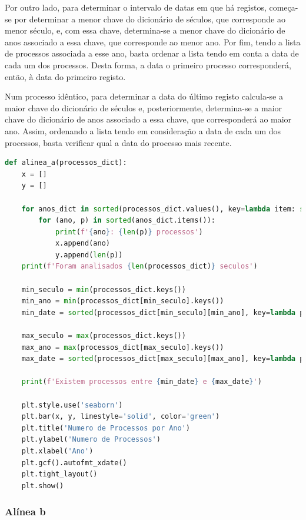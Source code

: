 \documentclass[a4paper, 11pt]{article}
\begin{document}
Por outro lado, para determinar o intervalo de datas em que há registos, começa-se por determinar a
menor chave do dicionário de séculos, que corresponde ao menor século, e, com essa chave, determina-se
a menor chave do dicionário de anos associado a essa chave, que corresponde ao menor ano. Por fim,
tendo a lista de processos associada a esse ano, basta ordenar a lista tendo em conta a data de cada
um dos processos. Desta forma, a data o primeiro processo corresponderá, então, à data do primeiro
registo.

Num processo idêntico, para determinar a data do último registo calcula-se a maior chave do dicionário
de séculos e, posteriormente, determina-se a maior chave do dicionário de anos associado a essa chave,
que corresponderá ao maior ano. Assim, ordenando a lista tendo em consideração a data de cada um dos
processos, basta verificar qual a data do processo mais recente.


\begin{lstlisting}[language=Python]
def alinea_a(processos_dict):
    x = []
    y = []

    for anos_dict in sorted(processos_dict.values(), key=lambda item: sorted(item)):
        for (ano, p) in sorted(anos_dict.items()):
            print(f'{ano}: {len(p)} processos')
            x.append(ano)
            y.append(len(p))
    print(f'Foram analisados {len(processos_dict)} seculos')

    min_seculo = min(processos_dict.keys())
    min_ano = min(processos_dict[min_seculo].keys())
    min_date = sorted(processos_dict[min_seculo][min_ano], key=lambda p: p.data)[0].data

    max_seculo = max(processos_dict.keys())
    max_ano = max(processos_dict[max_seculo].keys())
    max_date = sorted(processos_dict[max_seculo][max_ano], key=lambda p: p.data, reverse=True)[0].data

    print(f'Existem processos entre {min_date} e {max_date}')

    plt.style.use('seaborn')
    plt.bar(x, y, linestyle='solid', color='green')
    plt.title('Numero de Processos por Ano')
    plt.ylabel('Numero de Processos')
    plt.xlabel('Ano')
    plt.gcf().autofmt_xdate()
    plt.tight_layout()
    plt.show()
\end{lstlisting}

\subsubsection{Alínea b}
\end{document}
